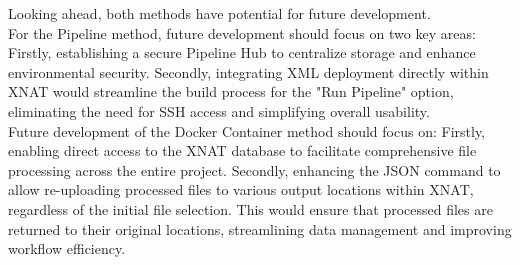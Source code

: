 Looking ahead, both methods have potential for future development.\\
For the Pipeline method, future development should focus on two key areas: Firstly, establishing a secure Pipeline Hub to centralize storage and enhance environmental security. Secondly, integrating XML deployment directly within XNAT would streamline the build process for the "Run Pipeline" option, eliminating the need for SSH access and simplifying overall usability.\\
Future development of the Docker Container method should focus on: Firstly, enabling direct access to the XNAT database to facilitate comprehensive file processing across the entire project. Secondly, enhancing the JSON command to allow re-uploading processed files to various output locations within XNAT, regardless of the initial file selection. This would ensure that processed files are returned to their original locations, streamlining data management and improving workflow efficiency.

